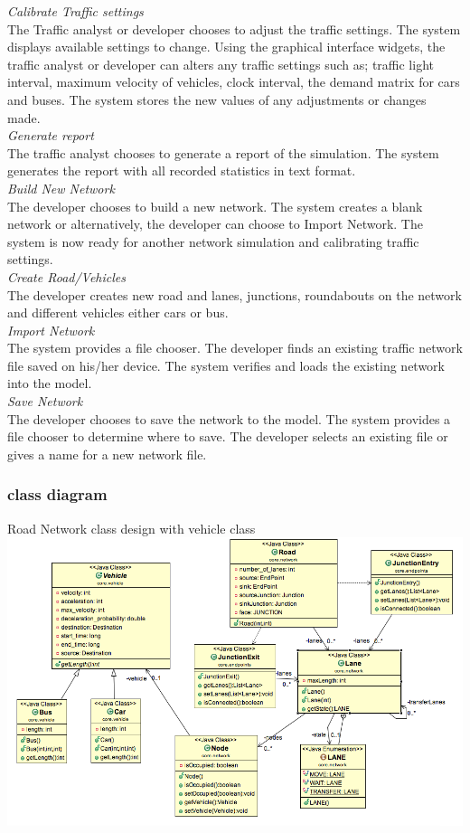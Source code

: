 \textit{Calibrate Traffic settings} \\
The Traffic analyst or developer chooses to adjust the traffic settings. The system displays available settings to change. Using the graphical interface widgets, the traffic analyst or developer can alters any traffic settings such as; traffic light interval, maximum velocity of vehicles, clock interval, the demand matrix for cars and buses. The system stores the new values of any adjustments or changes made. \\

\textit{Generate report} \\
The traffic analyst chooses to generate a report of the simulation. The system generates the report with all recorded statistics in text format. \\

\textit{Build New Network} \\
The developer chooses to build a new network. The system creates a blank network or alternatively, the developer can choose to Import Network. The system is now ready for another network simulation and calibrating traffic settings. \\

\textit{Create Road/Vehicles} \\
The developer creates new road and lanes, junctions, roundabouts on the network and different vehicles either cars or bus. \\

\textit{Import Network} \\
The system provides a file chooser. The developer finds an existing traffic network file saved on his/her device. The system verifies and loads the existing network into the model. \\

\textit{Save Network} \\
The developer chooses to save the network to the model. The system provides a file chooser to determine where to save. The developer selects an existing file or gives a name for a new network file.\\
 \subsubsection{class diagram}
Road Network class design with vehicle class\\
\includegraphics[scale=0.3]{./images/class1.png} ~\\

